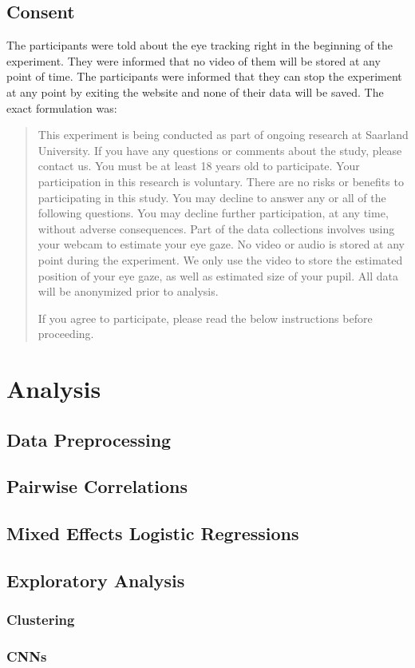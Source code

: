 \subsection{Consent}
The participants were told about the eye tracking right in the beginning of the experiment. They were informed that no video of them will be stored at any point of time. The participants were informed that they can stop the experiment at any point by exiting the website and none of their data will be saved. The exact formulation was: 

\begin{quote}
    This experiment is being conducted as part of ongoing research at Saarland University. If you have any questions or comments about the study, please contact us. You must be at least 18 years old to participate. Your participation in this research is voluntary. There are no risks or benefits to participating in this study. You may decline to answer any or all of the following questions. You may decline further participation, at any time, without adverse consequences. Part of the data collections involves using your webcam to estimate your eye gaze. No video or audio is stored at any point during the experiment. We only use the video to store the estimated position of your eye gaze, as well as estimated size of your pupil. All data will be anonymized prior to analysis. 

    If you agree to participate, please read the below instructions before proceeding.
\end{quote}


\section{Analysis}
\label{sec:analysis}

\subsection{Data Preprocessing}
\label{sec:analysis:preprocessing}

\subsection{Pairwise Correlations}
\label{sec:analysis:corr}

\subsection{Mixed Effects Logistic Regressions}
\label{sec:analysis:mixed_effects}

\subsection{Exploratory Analysis}
\label{sec:analysis:exploratory}

\subsubsection{Clustering}
\label{sec:analysis:exploratory:clustering}

\subsubsection{CNNs}
\label{sec:analysis:exploratory:cnn}
